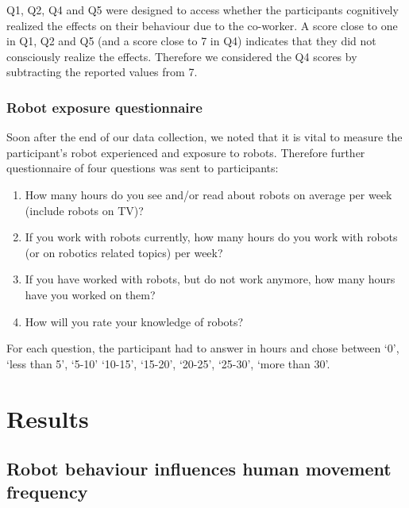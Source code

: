 Q1, Q2, Q4 and Q5 were designed to access whether the participants cognitively realized the effects on their behaviour due to the co-worker. A score close to one in Q1, Q2 and Q5 (and a score close to 7 in Q4) indicates that they did not consciously realize the effects. Therefore we considered the Q4 scores by subtracting the reported values from 7.

\subsubsection{Robot exposure questionnaire}

Soon after the end of our data collection, we noted that it is vital to measure the participant's robot experienced and exposure to robots. Therefore further questionnaire of four questions was sent to participants:

\begin{enumerate}[start=1,label={RQ\arabic*.}]
	\item How many hours do you see and/or read about robots on average per week (include robots on TV)?
	\item If you work with robots currently, how many hours do you work with robots (or on robotics related topics) per week?
	\item If you have worked with robots, but do not work anymore, how many hours have you worked on them?
	\item How will you rate your knowledge of robots?
\end{enumerate}

For each question, the participant had to answer in hours and chose between `0', `less than 5', `5-10' `10-15', `15-20', `20-25', `25-30', `more than 30'.


\section{Results}

\subsection{Robot behaviour influences human movement frequency}


